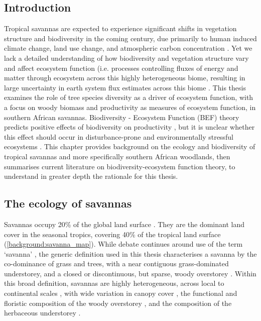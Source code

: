 \begin{refsection}


\chapter[\chaptertitle]{\chaptertitle}
\label{ch:background}

\section{Introduction}
\label{background:sec:intro}

Tropical savannas are expected to experience significant shifts in vegetation structure and biodiversity in the coming century, due primarily to human induced climate change, land use change, and atmospheric carbon concentration \citep{Ross2021, Scheiter2009, Moncrieff2016}. Yet we lack a detailed understanding of how biodiversity and vegetation structure vary and affect ecosystem function (i.e. processes controlling fluxes of energy and matter through ecosystem across this highly heterogeneous biome, resulting in large uncertainty in earth system flux estimates across this biome \citep{Ahlstrom2015}. This thesis examines the role of tree species diversity as a driver of ecosystem function, with a focus on woody biomass and productivity as measures of ecosystem function, in southern African savannas. Biodiversity - Ecosystem Function (BEF) theory predicts positive effects of biodiversity on productivity \citep{Tilman2014}, but it is unclear whether this effect should occur in disturbance-prone and environmentally stressful ecosystems \citep{Steudel2012, Baert2018}. This chapter provides background on the ecology and biodiversity of tropical savannas and more specifically southern African woodlands, then summarises current literature on biodiversity-ecosystem function theory, to understand in greater depth the rationale for this thesis.

\section{The ecology of savannas}
\label{background:sec:savanna}

Savannas occupy \textapprox{}20\% of the global land surface \citep{Scholes1993}. They are the dominant land cover in the seasonal tropics, covering \textapprox{}40\% of the tropical land surface \citep{Scholes1997} (\autoref{background:savanna_map}). While debate continues around use of the term `savanna' \citep{Lehmann2011, Ratnam2011}, the generic definition used in this thesis characterises a savanna by the co-dominance of grass and trees, with a near contiguous grass-dominated understorey, and a closed or discontinuous, but sparse, woody overstorey \citep{Scholes1997, Bond2008}. Within this broad definition, savannas are highly heterogeneous, across local to continental scales \citep{Bucini2007}, with wide variation in canopy cover \citep{Sankaran2005, Hirota2011}, the functional and floristic composition of the woody overstorey \citep{Fayolle2018, Solbrig1996}, and the composition of the herbaceous understorey \citep{Siebert2019, Coller2018}.


\end{refsection}
